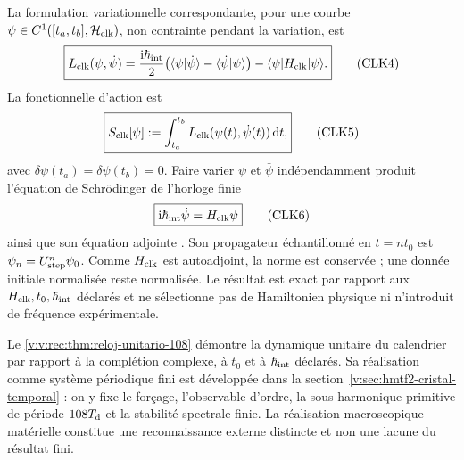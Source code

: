La formulation variationnelle correspondante, pour une courbe
\(\psi\in C^1([t_a,t_b],\mathcal H_{\rm clk})\), non contrainte pendant la
variation, est
\[
 \boxed{
 L_{\rm clk}(\psi,\dot\psi)
 =\frac{\mathrm i\hbar_{\rm int}}2
 \bigl(
 \langle\psi|\dot\psi\rangle
 -\langle\dot\psi|\psi\rangle
 \bigr)
 -\langle\psi|H_{\rm clk}|\psi\rangle.}
 \tag{CLK4}\label{v:v:rec:eq:lagrangiano-reloj-108}
\]
La fonctionnelle d’action est
\[
 \boxed{
 S_{\rm clk}[\psi]
 :=\int_{t_a}^{t_b}
 L_{\rm clk}(\psi(t),\dot\psi(t))\,\mathrm dt,}
 \tag{CLK5}\label{v:v:rec:eq:accion-reloj-108}
\]
avec \(\delta\psi(t_a)=\delta\psi(t_b)=0\).
Faire varier \(\psi\) et \(\bar\psi\) indépendamment produit l’équation de
Schrödinger de l’horloge finie
\[
 \boxed{\mathrm i\hbar_{\rm int}\dot\psi=H_{\rm clk}\psi}
 \tag{CLK6}\label{v:v:rec:eq:schrodinger-reloj-108}
\]
ainsi que son équation adjointe \cite{v:SchrodingerNobel}. Son propagateur échantillonné
en \(t=nt_0\) est \(\psi_n=U_{\rm step}^{n}\psi_0\). Comme \(H_{\rm clk}\) est
autoadjoint, la norme est conservée ; une donnée initiale normalisée reste
normalisée. Le résultat est exact par rapport aux
\(H_{\rm clk},t_0,\hbar_{\rm int}\) déclarés et ne sélectionne pas de Hamiltonien
physique ni n’introduit de fréquence expérimentale.

Le \cref{v:v:rec:thm:reloj-unitario-108} démontre la dynamique unitaire du calendrier
par rapport à la complétion complexe, à \(t_0\) et à \(\hbar_{\rm int}\)
déclarés. Sa réalisation comme système périodique fini est développée
dans la section~\ref{v:sec:hmtf2-cristal-temporal} : on y
fixe le forçage, l’observable d’ordre, la sous-harmonique primitive de période
\(108T_{\rm d}\) et la stabilité spectrale finie. La réalisation
macroscopique matérielle constitue une reconnaissance externe distincte et non une
lacune du résultat fini.
